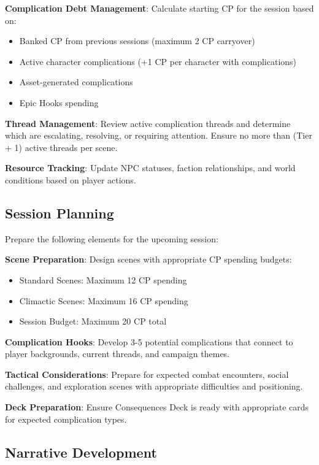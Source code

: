\textbf{Complication Debt Management}: Calculate starting CP for the session based on:
\begin{itemize}
    \item Banked CP from previous sessions (maximum 2 CP carryover)
    \item Active character complications (+1 CP per character with complications)
    \item Asset-generated complications
    \item Epic Hooks spending
\end{itemize}

\textbf{Thread Management}: Review active complication threads and determine which are escalating, resolving, or requiring attention. Ensure no more than (Tier + 1) active threads per scene.

\textbf{Resource Tracking}: Update NPC statuses, faction relationships, and world conditions based on player actions.

\subsection*{Session Planning}

Prepare the following elements for the upcoming session:

\textbf{Scene Preparation}: Design scenes with appropriate CP spending budgets:
\begin{itemize}
    \item Standard Scenes: Maximum 12 CP spending
    \item Climactic Scenes: Maximum 16 CP spending
    \item Session Budget: Maximum 20 CP total
\end{itemize}

\textbf{Complication Hooks}: Develop 3-5 potential complications that connect to player backgrounds, current threads, and campaign themes.

\textbf{Tactical Considerations}: Prepare for expected combat encounters, social challenges, and exploration scenes with appropriate difficulties and positioning.

\textbf{Deck Preparation}: Ensure Consequences Deck is ready with appropriate cards for expected complication types.

\subsection*{Narrative Development}

